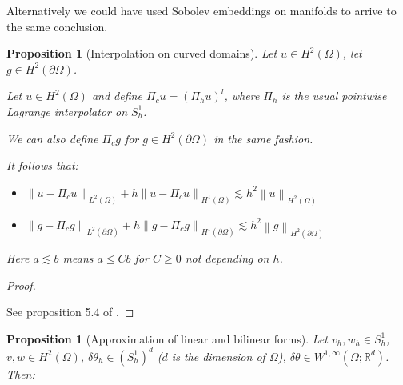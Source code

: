 \documentclass[english,a4paper,9pt,oneside]{scrbook}	%
\theoremstyle{break}
\newtheorem{prop}[equation]{Proposition}
\newenvironment{mproof}[1][\proofname]{%
  \begin{proof}[#1]$ $\par\nobreak\ignorespaces
}{%
  \end{proof}
}
\renewcommand*{\proofname}{Proof}
\theoremstyle{remark}
\newcommand{\mR}{\mathbb{R}}
\newcommand{\norm}[1]{\left\lVert#1\right\rVert}
\newcommand{\te}{\theta}
\begin{document}
\begin{appendices}
Alternatively we could have used Sobolev embeddings on manifolds to arrive to the same conclusion.

\begin{prop}[Interpolation on curved domains]
\label{prop:interp_curv}
Let $u \in H^2(\Omega)$, let $g \in H^2(\partial \Omega)$.

Let $u\in H^2(\Omega)$ and define $\Pi_c u = (\Pi_h u )^l$, where $\Pi_h$ is the usual pointwise Lagrange interpolator on $S^1_h$.

We can also define $\Pi_c g $ for $g \in H^2(\partial \Omega)$ in the same fashion.

It follows that:

\begin{itemize}
	\item $\norm{u-\Pi_c u}_{L^2(\Omega)} + h \norm{u-\Pi_c u}_{H^1(\Omega)}\lesssim h^2\norm{u}_{H^2(\Omega)}$
	\item $\norm{g-\Pi_c g}_{L^2(\partial \Omega)} + h \norm{g-\Pi_c g}_{H^1(\partial \Omega)}\lesssim h^2\norm{g}_{H^2(\partial \Omega)}$
\end{itemize}
Here $a \lesssim b$ means $a \leq Cb$ for $C\geq 0$ not depending on $h$.
\end{prop}

\begin{mproof}
See proposition 5.4 of \cite{elliott}.
\end{mproof}

\begin{prop}[Approximation of linear and bilinear forms]
\label{prop:lin_appr}
Let $v_h, w_h \in S^1_h$, $v,w \in H^2(\Omega)$, $\delta \te_h \in (S^1_h)^d$ ($d$ is the dimension of $\Omega$), $\delta \te \in W^{1,\infty}(\Omega;\mR^d)$. Then:


\end{prop}
\end{appendices}
\end{document}
